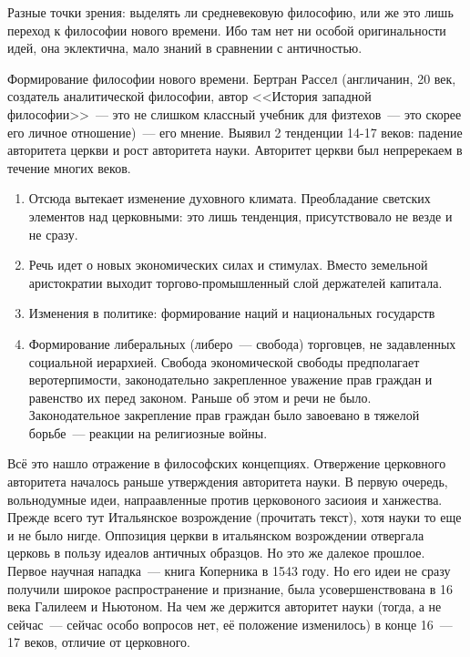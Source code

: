 Разные точки зрения: выделять ли средневековую философию, или же это лишь переход к философии нового времени. Ибо там нет ни особой оригинальности идей, она эклектична, мало знаний в сравнении с античностью.

Формирование философии нового времени.
Бертран Рассел (англичанин, 20 век, создатель аналитической философии, автор <<История западной философии>>~--- это не слишком классный учебник для физтехов~--- это скорее его личное отношение)~--- его мнение.
Выявил 2 тенденции 14-17 веков: падение авторитета церкви и рост авторитета науки. Авторитет церкви был непререкаем в течение многих веков. 

\begin{enumerate}
	\item Отсюда вытекает изменение духовного климата. Преобладание светских элементов над церковными: это лишь тенденция, присутствовало не везде и не сразу. 
	\item Речь идет о новых экономических силах и стимулах. Вместо земельной аристократии выходит торгово-промышленный слой держателей капитала.
	\item Изменения в политике: формирование наций и национальных государств
	\item Формирование либеральных (либеро~--- свобода) торговцев, не задавленных социальной иерархией. Свобода экономической свободы предполагает веротерпимости, законодательно закрепленное уважение прав граждан и равенство их перед законом. Раньше об этом и речи не было. Законодательное закрепление прав граждан было завоевано в тяжелой борьбе~--- реакции на религиозные войны.
\end{enumerate}
Всё это нашло отражение в философских концепциях. Отвержение церковного авторитета началось раньше утверждения авторитета науки. В первую очередь, вольнодумные идеи, напраавленные против церковоного засиоия и ханжества. Прежде всего тут Итальянское возрождение (прочитать текст), хотя науки то еще и не было нигде. Оппозиция церкви в итальянском возрождении отвергала церковь в пользу идеалов античных образцов. Но это же далекое прошлое. Первое научная нападка~--- книга Коперника в 1543 году. Но его идеи не сразу получили широкое распространение и признание, была усовершенствована в 16 века Галилеем и Ньютоном. 
На чем же держится авторитет науки (тогда, а не сейчас~--- сейчас особо вопросов нет, её положение изменилось) в конце 16~--- 17 веков, отличие от церковного.

